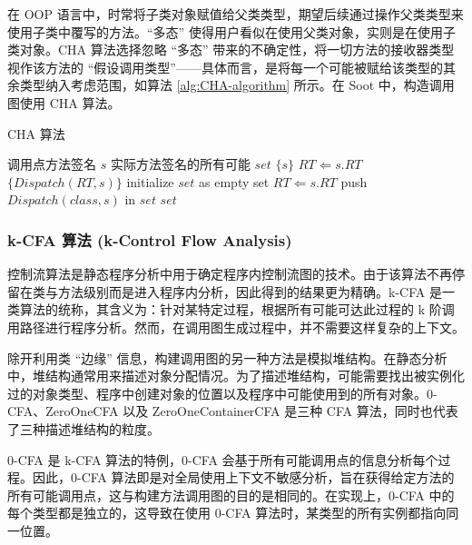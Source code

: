 在 OOP 语言中，时常将子类对象赋值给父类类型，期望后续通过操作父类类型来使用子类中覆写的方法。“多态” 使得用户看似在使用父类对象，实则是在使用子类对象。CHA 算法选择忽略 “多态” 带来的不确定性，将一切方法的接收器类型视作该方法的 “假设调用类型”——具体而言，是将每一个可能被赋给该类型的其余类型纳入考虑范围，如算法 \ref{alg:CHA-algorithm} 所示。在 Soot 中，构造调用图使用 CHA 算法。

\renewcommand{\thealgorithm}{6}
    \begin{algorithm}
        \caption{CHA 算法}
        \begin{algorithmic}[1]
            \Require 调用点方法签名 $s$
            \Ensure 实际方法签名的所有可能 $set$
                \State \Return $\{s\}$
                \State $RT \Leftarrow s.RT$
                \State \Return $\{Dispatch(RT, s)\}$
            \Else
                \State initialize $set$ as empty set
                \State $RT \Leftarrow s.RT$
                    \State push $Dispatch(class, s)$ in $set$
                \EndFor
                \State \Return $set$
            \EndIf
        \end{algorithmic}
        \label{alg:CHA-algorithm}
    \end{algorithm}

\subsubsection{k-CFA 算法 (k-Control Flow Analysis)}

控制流算法是静态程序分析中用于确定程序内控制流图的技术。由于该算法不再停留在类与方法级别而是进入程序内分析，因此得到的结果更为精确。k-CFA 是一类算法的统称，其含义为：针对某特定过程，根据所有可能可达此过程的 k 阶调用路径进行程序分析\cite{FLOWSENSITIVECONTROLFLOWANALYSIS}。然而，在调用图生成过程中，并不需要这样复杂的上下文。

除开利用类 “边缘” 信息，构建调用图的另一种方法是模拟堆结构。在静态分析中，堆结构通常用来描述对象分配情况。为了描述堆结构，可能需要找出被实例化过的对象类型、程序中创建对象的位置以及程序中可能使用到的所有对象。0-CFA、ZeroOneCFA 以及 ZeroOneContainerCFA 是三种 CFA 算法，同时也代表了三种描述堆结构的粒度。

0-CFA 是 k-CFA 算法的特例，0-CFA 会基于所有可能调用点的信息分析每个过程。因此，0-CFA 算法即是对全局使用上下文不敏感分析，旨在获得给定方法的所有可能调用点，这与构建方法调用图的目的是相同的。在实现上，0-CFA 中的每个类型都是独立的，这导致在使用 0-CFA 算法时，某类型的所有实例都指向同一位置。

